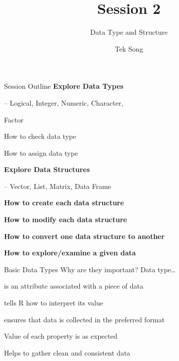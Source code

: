 \documentclass[
  ignorenonframetext,
]{beamer}
\title{Session 2}
\subtitle{Data Type and Structure}
\author{Tek Song}
\date{}
\begin{document}
\frame{\titlepage}

\begin{frame}{Session Outline}
\protect\hypertarget{session-outline}{}
\textbf{Explore Data Types}

-- Logical, Integer, Numeric, Character,

Factor

How to check data type

How to assign data type

\textbf{Explore Data Structures}

-- Vector, List, Matrix, Data Frame

\textbf{How to create each data structure}

\textbf{How to modify each data structure}

\textbf{How to convert one data structure to another}

\textbf{How to explore/examine a given data}
\end{frame}

\begin{frame}{Basic Data Types \textbar{} Why are they important?}
\protect\hypertarget{basic-data-types-why-are-they-important}{}
Data type\ldots{}

is an attribute associated with a piece of data

tells R how to interpret its value

ensures that data is collected in the preferred format

Value of each property is as expected

Helps to gather clean and consistent data
\end{frame}
\end{document}
